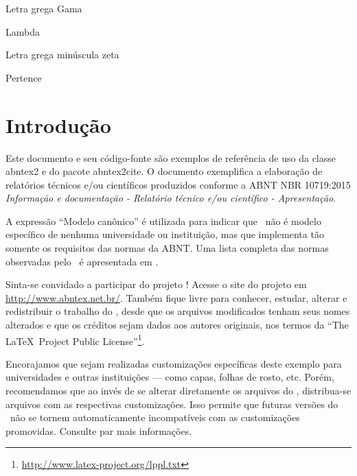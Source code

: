 \documentclass[
	12pt,				%
	openright,			%
	twoside,			%
	a4paper,			%
	english,			%
	french,				%
	spanish,			%
	brazil,				%
	]{abntex2}
\begin{document}
\begin{simbolos}
  \item[$ \Gamma $] Letra grega Gama
  \item[$ \Lambda $] Lambda
  \item[$ \zeta $] Letra grega minúscula zeta
  \item[$ \in $] Pertence
\end{simbolos}

\tableofcontents*
\cleardoublepage


\textual

\chapter*[Introdução]{Introdução}

Este documento e seu código-fonte são exemplos de referência de uso da classe
\textsf{abntex2} e do pacote \textsf{abntex2cite}. O documento 
exemplifica a elaboração de relatórios técnicos e/ou científicos produzidos
conforme a ABNT NBR 10719:2015 \emph{Informação e documentação - Relatório
técnico e/ou científico - Apresentação}.

A expressão ``Modelo canônico'' é utilizada para indicar que \abnTeX\ não é
modelo específico de nenhuma universidade ou instituição, mas que implementa tão
somente os requisitos das normas da ABNT. Uma lista completa das normas
observadas pelo \abnTeX\ é apresentada em .

Sinta-se convidado a participar do projeto \abnTeX! Acesse o site do projeto em
\url{http://www.abntex.net.br/}. Também fique livre para conhecer,
estudar, alterar e redistribuir o trabalho do \abnTeX, desde que os arquivos
modificados tenham seus nomes alterados e que os créditos sejam dados aos
autores originais, nos termos da ``The \LaTeX\ Project Public
License''\footnote{\url{http://www.latex-project.org/lppl.txt}}.

Encorajamos que sejam realizadas customizações específicas deste exemplo para
universidades e outras instituições --- como capas, folhas de rosto, etc.
Porém, recomendamos que ao invés de se alterar diretamente os arquivos do
\abnTeX, distribua-se arquivos com as respectivas customizações.
Isso permite que futuras versões do \abnTeX~não se tornem automaticamente
incompatíveis com as customizações promovidas. Consulte
 par mais informações.
\end{document}
